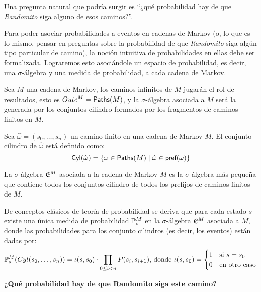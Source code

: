 Una pregunta natural que podría surgir es ``¿qué probabilidad hay de que
\emph{Randomito} siga alguno de esos caminos?''.

Para poder asociar probabilidades a eventos en cadenas de Markov (o, lo que es
lo mismo, pensar en preguntas sobre la probabilidad de que \emph{Randomito}
siga algún tipo particular de camino), la noción intuitiva de probabilidades en
ellas debe ser formalizada. Lograremos esto asociándole un espacio de
probabilidad, es decir, una $\sigma$-álgebra y una medida de probabilidad, a
cada cadena de Markov.

Sea $M$ una cadena de Markov, los caminos infinitos de $M$ jugarán el rol de
resultados, esto es $Outc^M = \textsf{Paths}(M)$, y la $\sigma$-álgebra asociada a $M$
será la generada por los conjuntos cilindro formados por los fragmentos de
caminos finitos en $M$.

\begin{definition}
	Sea $\hat \omega = (s_0, \dots, s_n)$ un camino finito en una cadena de Markov
	$M$. El conjunto cilindro de $\hat \omega$ está definido como: $$\textsf{Cyl}(\hat
		\omega) = \{\omega \in \textsf{Paths}(M) \mid \hat \omega \in \textsf{pref}(\omega)\}$$
\end{definition}

\begin{definition}
	La $\sigma$-álgebra $\mathfrak{E}^M$ asociada a la cadena de Markov $M$ es la $\sigma$-álgebra más pequeña que contiene todos los conjuntos cilindro de todos los prefijos de caminos finitos de $M$.
\end{definition}

De conceptos clásicos de teoría de probabilidad se deriva que para cada estado
$s$ existe una única medida de probabilidad $\mathbb{P}^M_{s}$ en la
$\sigma$-álgebra $\mathfrak{E}^M$ asociada a $M$, donde las probabilidades para los
conjunto cilindros (es decir, los eventos) están dadas por:
\begin{equation}
	\label{probMC}
	\mathbb{P}^M_{s}(Cyl(s_0, \dots, s_n)) = \iota(s,s_0) \cdot \prod_{0 \leq i < n} P(s_i, s_{i+1})\text{, donde }\iota(s,s_0) =
	\begin{cases}
		1 &\text{si } s = s_0 \\
		0 &\text{en otro caso}
	\end{cases}
\end{equation}

\textbf{¿Qué probabilidad hay de que Randomito siga este camino?}

